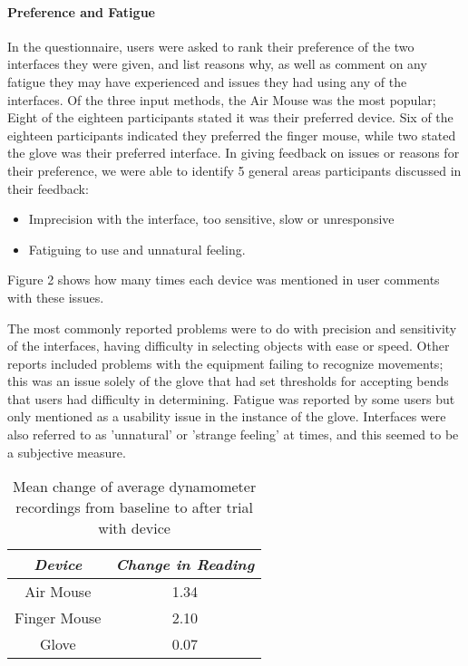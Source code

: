 \paragraph{Preference and Fatigue}

In the questionnaire, users were asked to rank their preference of the two interfaces they were given, and list reasons why, as well as comment on any fatigue they may have experienced and issues they had using any of the interfaces. Of the three input methods, the Air Mouse was the most popular; Eight of the eighteen participants stated it was their preferred device. Six of the eighteen participants indicated they preferred the finger mouse, while two stated the glove was their preferred interface. In giving feedback on issues or reasons for their preference, we were able to identify 5 general areas participants discussed  in their feedback:

\begin{itemize}
\item Imprecision with the interface, too sensitive, slow or
unresponsive
\item Fatiguing to use and unnatural feeling. 
\end{itemize}

Figure 2 shows how many times each device was mentioned in user comments with these issues.

The most commonly reported problems were to do with precision and sensitivity of the interfaces, having difficulty in selecting objects with ease or speed. Other reports included problems with the equipment failing to recognize movements; this was an issue solely of the glove that had set thresholds for accepting bends that users had difficulty in determining. Fatigue was reported by some users but only mentioned as a usability issue in the instance of the glove. Interfaces were also referred to as 'unnatural' or 'strange feeling' at times, and this seemed to be a subjective measure.

\begin{table}
\centering
\begin{tabular}{c | c}
\emph{Device} & \emph{Change in Reading} \\
\hline
Air Mouse & 1.34 \\
Finger Mouse & 2.10 \\
Glove & 0.07 \\
\end{tabular}
\caption{Mean change of average dynamometer recordings from baseline to after trial with device}
\end{table}

